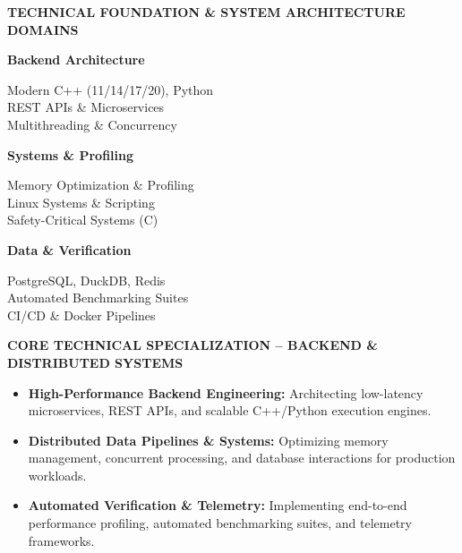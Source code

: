 \documentclass[10pt,a4paper]{article}
\begin{document}
\colorbox{primary!10}{%
\parbox{\dimexpr\textwidth-2\fboxsep\relax}{%
    \vspace{0.10cm}
    \centering
    {\bfseries\color{primary} TECHNICAL FOUNDATION \& SYSTEM ARCHITECTURE DOMAINS\par}
    \vspace{0.08cm}

    \begin{minipage}[t]{0.31\linewidth}
        \raggedright
        \textbf{\color{primary}Backend Architecture}\par
        Modern C++ (11/14/17/20), Python\\
        REST APIs \& Microservices\\
        Multithreading \& Concurrency
    \end{minipage}
    \hfill
    \begin{minipage}[t]{0.31\linewidth}
        \raggedright
        \textbf{\color{primary}Systems \& Profiling}\par
        Memory Optimization \& Profiling\\
        Linux Systems \& Scripting\\
        Safety-Critical Systems (C)
    \end{minipage}
    \hfill
    \begin{minipage}[t]{0.31\linewidth}
        \raggedright
        \textbf{\color{primary}Data \& Verification}\par
        PostgreSQL, DuckDB, Redis\\
        Automated Benchmarking Suites\\
        CI/CD \& Docker Pipelines
    \end{minipage}

    \vspace{0.08cm}
}%
}

\vspace{0.15cm}

{\centering
\colorbox{accent!25}{%
\parbox{\dimexpr\textwidth-25\fboxsep\relax}{%
    \vspace{0.08cm}
    \centering
    {\bfseries\color{primary}CORE TECHNICAL SPECIALIZATION -- BACKEND \& DISTRIBUTED SYSTEMS\par}
    \vspace{0.05cm}
    \raggedright
    \begin{itemize}[leftmargin=1.5em, itemsep=0.15em, topsep=0.15em]
        \item \textbf{\color{primary}High-Performance Backend Engineering:} Architecting low-latency microservices, REST APIs, and scalable C++/Python execution engines.
        \item \textbf{\color{primary}Distributed Data Pipelines \& Systems:} Optimizing memory management, concurrent processing, and database interactions for production workloads.
        \item \textbf{\color{primary}Automated Verification \& Telemetry:} Implementing end-to-end performance profiling, automated benchmarking suites, and telemetry frameworks.
    \end{itemize}
    \vspace{0.05cm}
}%
}\par}
\end{document}
